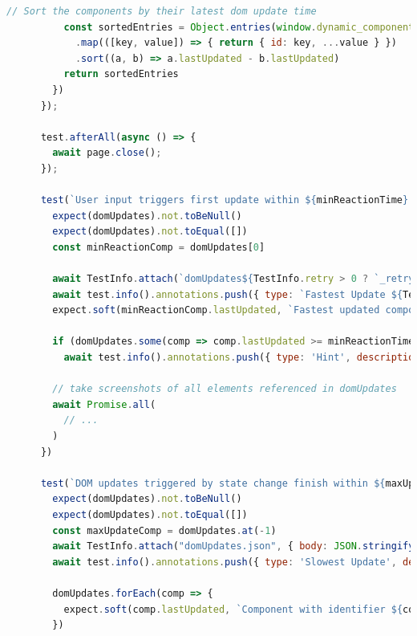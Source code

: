 \documentclass[a4paper, 10pt]{article}
\begin{document}
\begin{lstlisting}[caption={Test file for component update times}, label={lst:state-change-spec}, language=JavaScript]
          // Sort the components by their latest dom update time
          const sortedEntries = Object.entries(window.dynamic_component_performance)
            .map(([key, value]) => { return { id: key, ...value } })
            .sort((a, b) => a.lastUpdated - b.lastUpdated)
          return sortedEntries
        })
      });

      test.afterAll(async () => {
        await page.close();
      });

      test(`User input triggers first update within ${minReactionTime} ms`, { tag: ['@minimalReactionTime'] }, async ({ }, TestInfo) => {
        expect(domUpdates).not.toBeNull()
        expect(domUpdates).not.toEqual([])
        const minReactionComp = domUpdates[0]

        await TestInfo.attach(`domUpdates${TestInfo.retry > 0 ? `_retry_${TestInfo.retry}` : ''}.json`, { body: JSON.stringify(domUpdates, null, 2), contentType: "application/json" })
        await test.info().annotations.push({ type: `Fastest Update ${TestInfo.retry > 0 ? `(retry #${TestInfo.retry})` : ''}`, description: `Component with id ${minReactionComp.id} loaded ${minReactionComp.lastUpdated}ms after user input (xPath: ${minReactionComp.xpath})` });
        expect.soft(minReactionComp.lastUpdated, `Fastest updated component with identifier ${minReactionComp.id} should update within ${minReactionTime} ms`).toBeLessThanOrEqual(minReactionTime)

        if (domUpdates.some(comp => comp.lastUpdated >= minReactionTime))
          await test.info().annotations.push({ type: 'Hint', description: `Screenshots below show slow updating components` });

        // take screenshots of all elements referenced in domUpdates
        await Promise.all(
          // ...
        )
      })

      test(`DOM updates triggered by state change finish within ${maxUpdateTime} ms`, { tag: ['@maximalReactionTime'] }, async ({ }, TestInfo) => {
        expect(domUpdates).not.toBeNull()
        expect(domUpdates).not.toEqual([])
        const maxUpdateComp = domUpdates.at(-1)
        await TestInfo.attach("domUpdates.json", { body: JSON.stringify(domUpdates, null, 2), contentType: "application/json" })
        await test.info().annotations.push({ type: 'Slowest Update', description: `Component with id ${maxUpdateComp.id} loaded ${maxUpdateComp.lastUpdated}ms after user input (xPath: ${maxUpdateComp.xpath})` });

        domUpdates.forEach(comp => {
          expect.soft(comp.lastUpdated, `Component with identifier ${comp.id} should finish updates within ${maxUpdateTime} ms`).toBeLessThanOrEqual(maxUpdateTime)
        })


\end{lstlisting}
\end{document}
